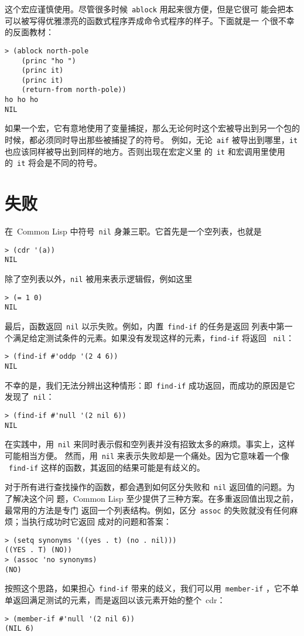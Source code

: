这个宏应谨慎使用。尽管很多时候~\verb|ablock| 用起来很方便，但是它很可
能会把本可以被写得优雅漂亮的函数式程序弄成命令式程序的样子。下面就是一
个很不幸的反面教材：
\begin{lstlisting}
> (ablock north-pole
    (princ "ho ")
    (princ it)
    (princ it)
    (return-from north-pole))
ho ho ho
NIL
\end{lstlisting}

如果一个宏，它有意地使用了变量捕捉，那么无论何时这个宏被导出到另一个包的时候，都必须同时导出那些被捕捉了的符号。
例如，无论~\verb|aif| 被导出到哪里，\verb|it| 也应该同样被导出到同样的地方。否则出现在宏定义里
的~\verb|it| 和宏调用里使用的~\verb|it| 将会是不同的符号。

\section{失败}
\label{sec:failure}

在~Common Lisp 中符号~\texttt{nil} 身兼三职。它首先是一个空列表，也就是
\begin{lstlisting}
> (cdr '(a))
NIL
\end{lstlisting}
除了空列表以外，\texttt{nil} 被用来表示逻辑假，例如这里
\begin{lstlisting}
> (= 1 0)
NIL
\end{lstlisting}
最后，函数返回~\texttt{nil} 以示失败。例如，内置~\texttt{find-if} 的任务是返回
列表中第一个满足给定测试条件的元素。如果没有发现这样的元素，\texttt{find-if} 将返回
~\texttt{nil}：
\begin{lstlisting}
> (find-if #'oddp '(2 4 6))
NIL
\end{lstlisting}
不幸的是，我们无法分辨出这种情形：即~\texttt{find-if} 成功返回，而成功的原因是它发现了~\texttt{nil}：
\begin{lstlisting}
> (find-if #'null '(2 nil 6))
NIL
\end{lstlisting}

在实践中，用~\texttt{nil} 来同时表示假和空列表并没有招致太多的麻烦。事实上，这样可能相当方便。
然而，用~\texttt{nil} 来表示失败却是一个痛处。因为它意味着一个像
~\texttt{find-if} 这样的函数，其返回的结果可能是有歧义的。

对于所有进行查找操作的函数，都会遇到如何区分失败和~\texttt{nil} 返回值的问题。为了解决这个问
题，Common Lisp 至少提供了三种方案。在多重返回值出现之前，最常用的方法是专门
返回一个列表结构。例如，区分~\texttt{assoc} 的失败就没有任何麻烦；当执行成功时它返回
成对的问题和答案：
\begin{lstlisting}
> (setq synonyms '((yes . t) (no . nil)))
((YES . T) (NO))
> (assoc 'no synonyms)
(NO)
\end{lstlisting}
按照这个思路，如果担心~\texttt{find-if} 带来的歧义，我们可以用~\texttt{member-if}
，它不单单返回满足测试的元素，而是返回以该元素开始的整个~cdr：
\begin{lstlisting}
> (member-if #'null '(2 nil 6))
(NIL 6)
\end{lstlisting}

